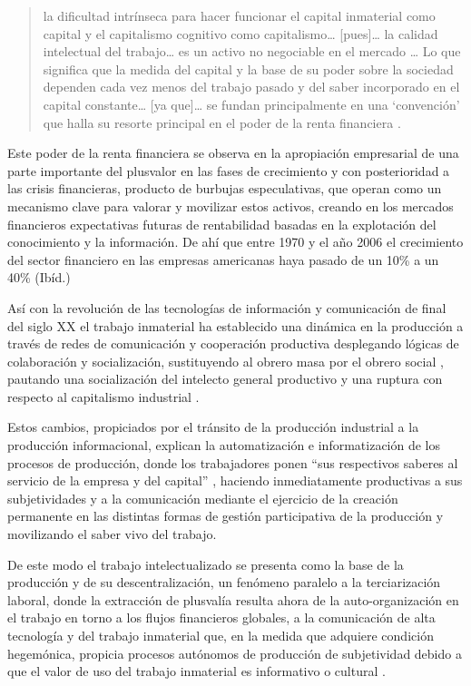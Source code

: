 \documentclass[
  spanish,
  11pt,
  a4paper,
]{scrbook}
\begin{document}
\begin{quote}
la dificultad intrínseca para hacer funcionar el capital inmaterial como
capital y el capitalismo cognitivo como capitalismo\ldots{}
{[}pues{]}\ldots{} la calidad intelectual del trabajo\ldots{} es un
activo no negociable en el mercado \ldots{} Lo que significa que la
medida del capital y la base de su poder sobre la sociedad dependen cada
vez menos del trabajo pasado y del saber incorporado en el capital
constante\ldots{} {[}ya que{]}\ldots{} se fundan principalmente en una
`convención' que halla su resorte principal en el poder de la renta
financiera \autocite[34-35]{Vercellone2016}.
\end{quote}

Este poder de la renta financiera se observa en la apropiación
empresarial de una parte importante del plusvalor en las fases de
crecimiento y con posterioridad a las crisis financieras, producto de
burbujas especulativas, que operan como un mecanismo clave para valorar
y movilizar estos activos, creando en los mercados financieros
expectativas futuras de rentabilidad basadas en la explotación del
conocimiento y la información. De ahí que entre 1970 y el año 2006 el
crecimiento del sector financiero en las empresas americanas haya pasado
de un 10\% a un 40\% (Ibíd.)

Así con la revolución de las tecnologías de información y comunicación
de final del siglo XX el trabajo inmaterial ha establecido una dinámica
en la producción a través de redes de comunicación y cooperación
productiva desplegando lógicas de colaboración y socialización,
sustituyendo al obrero masa por el obrero social \autocite{Negri2001},
pautando una socialización del intelecto general productivo y una
ruptura con respecto al capitalismo industrial \autocite{Fuchs2012}.

Estos cambios, propiciados por el tránsito de la producción industrial a
la producción informacional, explican la automatización e
informatización de los procesos de producción, donde los trabajadores
ponen ``sus respectivos saberes al servicio de la empresa y del
capital'' \autocite[22]{Vercellone2016}, haciendo inmediatamente
productivas a sus subjetividades y a la comunicación mediante el
ejercicio de la creación permanente en las distintas formas de gestión
participativa de la producción y movilizando el saber vivo del trabajo.

De este modo el trabajo intelectualizado se presenta como la base de la
producción y de su descentralización, un fenómeno paralelo a la
terciarización laboral, donde la extracción de plusvalía resulta ahora
de la auto-organización en el trabajo en torno a los flujos financieros
globales, a la comunicación de alta tecnología y del trabajo inmaterial
que, en la medida que adquiere condición hegemónica, propicia procesos
autónomos de producción de subjetividad debido a que el valor de uso del
trabajo inmaterial es informativo o cultural
\autocite{Caffentzis2016,Vercellone2009,Rullani2004}.
\end{document}
